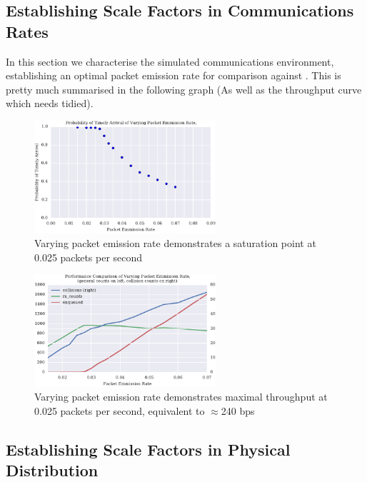 \documentclass[runningheads,a4paper]{llncs}
\begin{document}
\subsection{Establishing Scale Factors in Communications Rates}

In this section we characterise the simulated communications environment, establishing an optimal packet emission rate for comparison against \cite{Guo11}. This is pretty much summarised in the following graph (As well as the throughput curve which needs tidied).

\begin{figure}[h]
  \centering
  \includegraphics[width=0.6\textwidth]{img/prod_breakdown_static.pdf}
  \caption{Varying packet emission rate demonstrates a saturation point at 0.025 packets per second}
  \label{fig:prod_breakdown}
\end{figure}
\begin{figure}[h]
  \centering
  \includegraphics[width=0.6\textwidth]{img/throughput_performance_static.pdf}
  \caption{Varying packet emission rate demonstrates maximal throughput at 0.025 packets per second, equivalent to $\approx$240 bps}
  \label{fig:throughput_performance}
\end{figure}


\subsection{Establishing Scale Factors in Physical Distribution}
\end{document}

